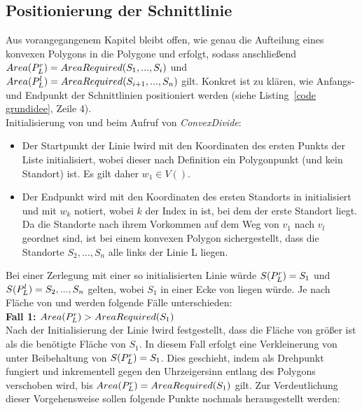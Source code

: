 \documentclass[ngerman]{seminarbeitrag}
\begin{document}
\subsection{Positionierung der Schnittlinie}\label{schnittlinie konvex}

Aus vorangegangenem Kapitel bleibt offen, wie genau die Aufteilung eines konvexen Polygons \cp in die Polygone \prl und \pll erfolgt, sodass anschließend
$Area(P_{L}^{r})=AreaRequired(S_{1},...,S_{i})$ und $Area(P_{L}^{l})=AreaRequired(S_{i+1},...,S_{n}) $ gilt.
Konkret ist zu klären, wie Anfangs- und Endpunkt der Schnittlinien positioniert werden (siehe Listing~\ref{code grundidee}, Zeile 4). \\
Initialisierung von \ls und \Le beim Aufruf von \mbox{\textit{ConvexDivide}}:

\begin{itemize}
\item Der Startpunkt \ls der Linie \l wird mit den Koordinaten des ersten Punkts der Liste \w initialisiert, wobei dieser nach Definition ein Polygonpunkt (und
kein Standort) ist. Es gilt daher $w_{1} \in V()$.
\item Der Endpunkt \Le wird mit den Koordinaten des ersten Standorts in \w initialisiert und mit $w_{k}$ notiert, wobei $k$ der Index in \w ist, bei dem der
erste Standort liegt. Da die Standorte nach ihrem Vorkommen auf dem Weg von $v_{1}$ nach $v_{l}$ geordnet sind, ist bei einem konvexen Polygon sichergestellt,
dass die Standorte $S_{2},…,S_{n}$ alle links der Linie L liegen.
\end{itemize}

Bei einer Zerlegung mit einer so initialisierten Linie würde $S(P_{L}^{r})=S_{1}$ und $S(P_{L}^{l})=S_{2},...,S_{n}$ gelten, wobei $S_{1}$ in einer Ecke von \prl
liegen würde. Je nach Fläche von \prl und  werden folgende Fälle unterschieden: \\

\textbf{Fall 1: $Area(P_{L}^{r})>AreaRequired(S_{1})$} \\
Nach der Initialisierung der Linie \l wird festgestellt, dass die Fläche von \prl größer ist als die benötigte Fläche von $S_{1}$. In diesem Fall erfolgt eine
Verkleinerung von \ar{\mprl} unter Beibehaltung von $S(P_{L}^{r})=S_{1}$. Dies geschieht, indem \Le als Drehpunkt fungiert und \ls inkrementell gegen den Uhrzeigersinn entlang des Polygons
verschoben wird, bis $Area(P_{L}^{r})=AreaRequired(S_{1})$ gilt. Zur Verdeutlichung dieser Vorgehensweise sollen folgende Punkte nochmals herausgestellt werden:
\end{document}
